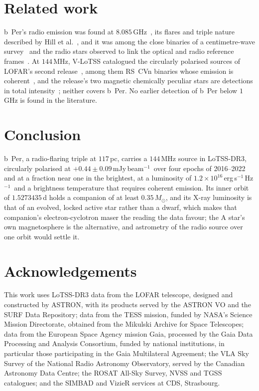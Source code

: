 \documentclass[3p,11pt]{elsarticle}
\newcommand{\mJyb}{mJy\,beam$^{-1}$}
\newcommand{\lnu}{erg\,s$^{-1}$\,Hz$^{-1}$}
\newcommand{\sci}[2]{#1\times10^{#2}}
\newcommand{\Msun}{M_\odot}
\begin{document}
\section{Related work}\label{sec:related}

b~Per's radio emission was found at $8.085$\,GHz~\cite{HjellmingWade1973}, its flares and
triple nature described by Hill et al.~\cite{Hill1976}, and it was among the close
binaries of a centimetre-wave survey~\cite{Spangler1977} and the radio stars observed to
link the optical and radio reference frames~\cite{Walter1997}. At $144$\,MHz, V-LoTSS catalogued the
circularly polarised sources of LOFAR's second release~\cite{Callingham2023}, among them
RS~CVn binaries whose emission is coherent~\cite{Toet2021}, and the release's two magnetic
chemically peculiar stars are detections in total intensity~\cite{Hajduk2022}; neither
covers b~Per. No earlier detection of b~Per below $1$\,GHz is found in the literature.

\section{Conclusion}\label{sec:conclusion}

b~Per, a radio-flaring triple at $117$\,pc, carries a $144$\,MHz source in LoTSS-DR3,
circularly polarised at $+0.44\pm0.09$\,\mJyb\ over four epochs of 2016--2022 and at a
fraction near one in the brightest, at a luminosity of $\sci{1.2}{16}$\,\lnu\ and a
brightness temperature that requires coherent emission. Its inner orbit of
$1.5273435$\,d holds a companion of at least $0.35\,\Msun$, and its X-ray luminosity is
that of an evolved, locked active star rather than a dwarf, which makes that companion's
electron-cyclotron maser the reading the data favour; the A star's own magnetosphere is
the alternative, and astrometry of the radio source over one orbit would settle it.

\section*{Acknowledgements}

This work uses LoTSS-DR3 data from the LOFAR telescope, designed and constructed by
ASTRON, with its products served by the ASTRON VO and the SURF Data Repository; data
from the TESS mission, funded by NASA's Science Mission Directorate, obtained from the
Mikulski Archive for Space Telescopes; data from the European Space Agency mission
Gaia, processed by the Gaia Data Processing and Analysis Consortium, funded by national
institutions, in particular those participating in the Gaia Multilateral Agreement; the
VLA Sky Survey of the National Radio Astronomy Observatory, served by the Canadian
Astronomy Data Centre; the ROSAT All-Sky Survey, NVSS and TGSS catalogues; and the
SIMBAD and VizieR services at CDS, Strasbourg.
\end{document}
